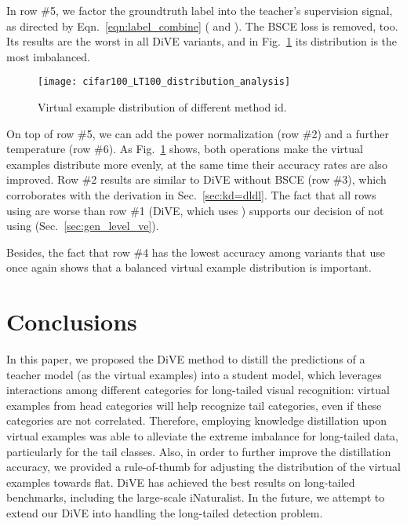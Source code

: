 \documentclass[10pt,twocolumn,letterpaper]{article}
\begin{document}
In row \#5, we factor the groundtruth label into the teacher’s supervision signal, as directed by Eqn.~\eqref{eqn:label_combine} ( and ). The BSCE loss is removed, too. Its results are the worst in all DiVE variants, and in Fig.~\ref{ablation_fig} its distribution is the most imbalanced.

 \begin{figure}
   \centering
   \texttt{[image: cifar100\_LT100\_distribution\_analysis]}
   \caption{Virtual  example  distribution of different method id.}
   \label{ablation_fig}
\end{figure}

On top of row \#5, we can add the power normalization (row \#2) and a further temperature  (row \#6). As Fig.~\ref{ablation_fig} shows, both operations make the virtual examples distribute more evenly, at the same time their accuracy rates are also improved. Row \#2 results are similar to DiVE without BSCE (row \#3), which corroborates with the derivation in Sec.~\ref{sec:kd=dldl}. The fact that all rows using  are worse than row \#1 (DiVE, which uses ) supports our decision of not using  (\cf Sec.~\ref{sec:gen_level_ve}).

Besides, the fact that row \#4 has the lowest accuracy among variants that use  once again shows that a balanced virtual example distribution is important.

\section{Conclusions}

In this paper, we proposed the DiVE method to distill the predictions of a teacher model (as the virtual examples) into a student model, which leverages interactions among different categories for long-tailed visual recognition: virtual examples from head categories will help recognize tail categories, even if these categories are not correlated. Therefore, employing knowledge distillation upon virtual examples was able to alleviate the extreme imbalance for long-tailed data, particularly for the tail classes. Also, in order to further improve the distillation accuracy, we provided a rule-of-thumb for adjusting the distribution of the virtual examples towards flat. DiVE has achieved the best results on long-tailed benchmarks, including the large-scale iNaturalist. In the future, we attempt to extend our DiVE into handling the long-tailed detection problem.


\clearpage
\end{document}
